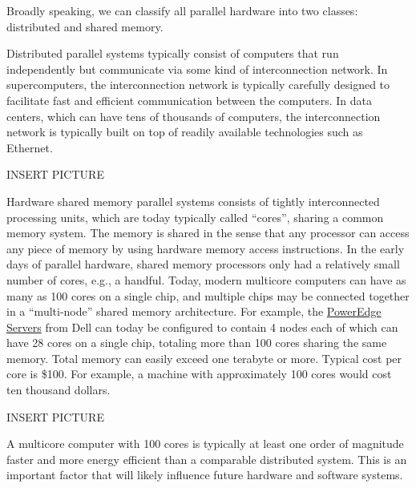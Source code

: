 \begin{gram}
Broadly speaking, we can classify all parallel hardware into two classes: distributed and shared memory.
%

Distributed parallel systems typically consist of computers that run independently but communicate via some kind of interconnection network.
%
In supercomputers, the interconnection network is typically carefully designed to facilitate fast and efficient communication between the computers.
%
In data centers, which can have tens of thousands of computers, the interconnection network is typically built on top of readily available technologies such as Ethernet.

INSERT PICTURE

Hardware shared memory parallel systems consists of tightly interconnected processing units, which are today typically called ``cores'', sharing a common memory system.
%
The memory is shared in the sense that any processor can access any piece of memory by using hardware memory access instructions.
%
In the early days of parallel hardware, shared memory processors only had a relatively small number of cores, e.g., a handful.
%
Today, modern multicore computers can have as many as 100 cores on a single chip, and multiple chips may be connected together in a ``multi-node'' shared memory architecture.
%
For example,
%
the
\href{https://www.dell.com/en-us/work/shop/povw/poweredge-r940xa}{PowerEdge Servers}
%
from Dell can today be configured to contain 4 nodes each of which can have 28 cores on a single chip, totaling more than 100 cores sharing the same memory. 
%
Total memory can easily exceed one terabyte or more.
%
Typical cost per core is \$100.  
%
For example, a machine with approximately 100 cores would cost ten thousand dollars.

INSERT PICTURE

\end{gram}

\begin{remark}
A multicore computer with 100 cores is typically at least one order of magnitude faster and more energy efficient than a comparable distributed system.
%
This is an important factor that will likely influence future hardware and software systems. 
\end{remark}

